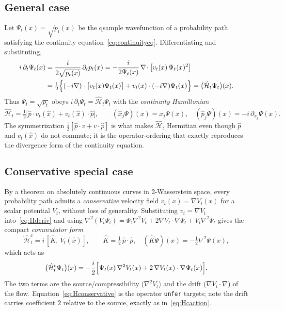 \documentclass[11pt, a4paper]{article}
\newcommand{\Hgen}{\hat{\mathcal{H}}}
\newcommand{\Kop}{\hat{K}}
\begin{document}
\subsection{General case}

Let $\Psi_t(x)=\sqrt{p_t(x)}$ be the qsample wavefunction of a probability path
satisfying the continuity equation~\eqref{eq:continuityeq}. Differentiating and
substituting,
\begin{align}
  i\,\partial_t\Psi_t(x)
  &=\frac{i}{2\sqrt{p_t(x)}}\,\partial_t p_t(x)
  =-\frac{i}{2\Psi_t(x)}\,\nabla\!\cdot\bigl[v_t(x)\,\Psi_t(x)^2\bigr]\notag\\
  &=\tfrac12\Bigl\{(-i\nabla)\cdot\bigl[v_t(x)\Psi_t(x)\bigr]
  +v_t(x)\cdot(-i\nabla)\Psi_t(x)\Bigr\}
  =\bigl(\Hgen_t\Psi_t\bigr)(x).
  \label{eq:Hderiv}
\end{align}
Thus $\Psi_t=\sqrt{p_t}$ obeys $i\,\partial_t\Psi_t=\Hgen_t\Psi_t$ with the
\emph{continuity Hamiltonian}
\begin{equation}
  \Hgen_t=\tfrac12\bigl[\hat p\cdot v_t(\hat x)+v_t(\hat x)\cdot\hat p\bigr],
  \qquad
  (\hat x_j\Psi)(x)=x_j\Psi(x),\quad
  (\hat p_j\Psi)(x)=-i\,\partial_{x_j}\Psi(x).
  \label{eq:Hgeneral}
\end{equation}
The symmetrization $\tfrac12[\hat p\cdot v+v\cdot\hat p]$ is what makes
$\Hgen_t$ Hermitian even though $\hat p$ and $v_t(\hat x)$ do not commute; it is
the operator-ordering that exactly reproduces the divergence form of the
continuity equation.

\subsection{Conservative special case}

By a theorem on absolutely continuous curves in 2-Wasserstein space, every
probability path admits a \emph{conservative} velocity field
$v_t(x)=\nabla V_t(x)$ for a scalar potential $V_t$, without loss of
generality. Substituting $v_t=\nabla V_t$ into~\eqref{eq:Hderiv} and using
$\nabla^2(V_t\Psi_t)=\Psi_t\nabla^2 V_t+2\nabla V_t\cdot\nabla\Psi_t
+V_t\nabla^2\Psi_t$ gives the compact \emph{commutator form}
\begin{equation}
  \Hgen_t^c=i\,[\Kop,\,V_t(\hat x)],\qquad
  \Kop=\tfrac12\,\hat p\cdot\hat p,\quad
  (\Kop\Psi)(x)=-\tfrac12\nabla^2\Psi(x),
  \label{eq:Hconservative}
\end{equation}
which acts as
\begin{equation}
  \bigl(\Hgen_t^c\Psi_t\bigr)(x)
  =-\frac{i}{2}\Bigl[\Psi_t(x)\,\nabla^2 V_t(x)
  +2\,\nabla V_t(x)\cdot\nabla\Psi_t(x)\Bigr].
  \label{eq:Hcaction}
\end{equation}
The two terms are the source/compressibility ($\nabla^2 V_t$) and the drift
($\nabla V_t\cdot\nabla$) of the flow. Equation~\eqref{eq:Hconservative} is the
operator \texttt{unfer} targets; note the drift carries coefficient $2$
relative to the source, exactly as in~\eqref{eq:Hcaction}.
\end{document}
